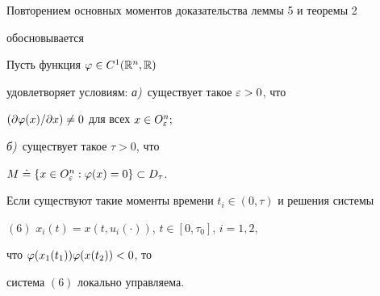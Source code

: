 Повторением основных моментов доказательства леммы 5 и теоремы 2


обосновывается





\begin{thm}


Пусть функция $\varphi\in C^1(\Bbb R^n,\Bbb R)$


удовлетворяет условиям: {\em а)}~существует такое $\varepsilon>0$, что


$(\partial\varphi(x)/\partial x)\ne 0$ для всех $x\in O^n_{\varepsilon};$


{\em б)}~существует такое $\tau>0$, что


$M\doteq\{x\in O^n_{\varepsilon}:\varphi(x)=0\}\subset D_{\tau}$.





Если существуют такие моменты времени $t_i\in(0,\tau)$ и решения системы


$(6)$ $x_i(t)=x(t,u_i(\cdot))$, $t\in[0,\tau_0]$, $i=1,2$,


что $\varphi(x_1(t_1))\varphi(x(t_2))<0$, то


система $(6)$ локально управляема.


\end{thm}








